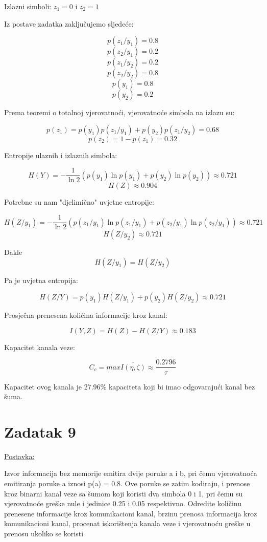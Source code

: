 \documentclass[12pt]{article}
\begin{document}
Izlazni simboli: $z_1 = 0$ i $z_2 = 1$

Iz postave zadatka zaključujemo sljedeće:

$$p(z_1/y_1) = 0.8$$
$$p(z_2/y_1) = 0.2$$
$$p(z_1/y_2) = 0.2$$
$$p(z_2/y_2) = 0.8$$
$$p(y_1) = 0.8$$
$$p(y_2) = 0.2$$

Prema teoremi o totalnoj vjerovatnoći, vjerovatnoće simbola na izlazu su:

$$p(z_1) = p(y_1) p(z_1 / y_1) + p(y_2) p(z_1 / y_2) = 0.68$$
$$p(z_2) = 1 - p(z_1) = 0.32$$

Entropije ulaznih i izlaznih simbola:

$$H(Y) = - \frac{1}{\ln{2}} ( p(y_1) \ln{p(y_1)} +  p(y_2) \ln{p(y_2)}) \approx 0.721$$
$$H(Z) \approx 0.904$$

Potrebne su nam "djelimično" uvjetne entropije:

$$H(Z/y_1) = - \frac{1}{\ln{2}} ( p(z_1/y_1) \ln{p(z_1/y_1)} + p(z_2 / y_1) \ln{p(z_2 / y_1)}) \approx 0.721$$
$$H(Z/y_2) \approx 0.721$$

Dakle $$H(Z/y_1) = H(Z/y_2)$$

Pa je uvjetna entropija:

$$H(Z/Y) = p(y_1) H(Z/y_1) + p(y_2) H(Z/y_2) \approx 0.721$$

Prosječna prenesena količina informacije kroz kanal:

$$I(Y, Z) = H(Z) - H(Z / Y) \approx 0.183$$

Kapacitet kanala veze:

$$C_c = max \overline{I(\eta, \zeta)} \approx \frac{0.2796}{\tau}$$

Kapacitet ovog kanala je 27.96\% kapaciteta koji bi imao odgovarajući kanal bez šuma.

\newpage
\section*{Zadatak 9\label{Z9}}

\underline{Postavka:}

Izvor informacija bez memorije emitira dvije poruke a i b, pri čemu vjerovatnoća emitiranja poruke a iznosi p(a) = 0.8. Ove poruke se zatim kodiraju, i prenose kroz binarni kanal veze sa šumom koji koristi dva simbola 0 i 1, pri čemu su vjerovatnoće greške nule i jedinice 0.25 i 0.05 respektivno. Odredite količinu prenesene informacije kroz komunikacioni kanal, brzinu prenosa informacija kroz komunikacioni kanal, procenat iskorištenja kanala veze i vjerovatnoću greške u prenosu ukoliko se koristi
\end{document}
